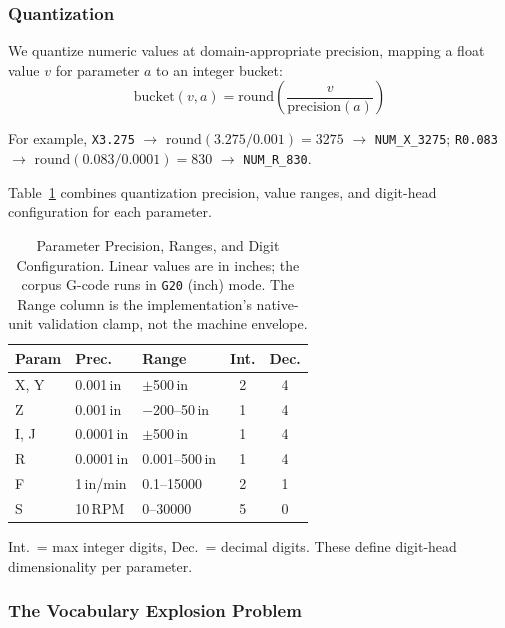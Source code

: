 \documentclass[sensors,article,submit,moreauthors,pdftex]{Definitions/mdpi}
\begin{document}
\subsubsection{Quantization}

We quantize numeric values at domain-appropriate precision, mapping a float value $v$ for parameter $a$ to an integer bucket:
\begin{equation}
    \text{bucket}(v, a) = \text{round}\!\left(\frac{v}{\text{precision}(a)}\right)
\end{equation}

\noindent For example, \texttt{X3.275} $\to$ $\text{round}(3.275/0.001) = 3275$ $\to$ \texttt{NUM\_X\_3275}; \texttt{R0.083} $\to$ $\text{round}(0.083/0.0001) = 830$ $\to$ \texttt{NUM\_R\_830}.

Table~\ref{tab:precision} combines quantization precision, value ranges, and digit-head configuration for each parameter.

\begin{table}[htbp]
\centering
\caption{Parameter Precision, Ranges, and Digit Configuration. Linear values are in inches; the corpus G-code runs in \texttt{G20} (inch) mode. The Range column is the implementation's native-unit validation clamp, not the machine envelope.}
\label{tab:precision}
\small
\begin{tabular}{@{}lllcc@{}}
\toprule
\textbf{Param} & \textbf{Prec.} & \textbf{Range} & \textbf{Int.} & \textbf{Dec.} \\
\midrule
X, Y  & 0.001\,in  & $\pm$500\,in     & 2 & 4 \\
Z     & 0.001\,in  & $-$200--50\,in   & 1 & 4 \\
I, J  & 0.0001\,in & $\pm$500\,in     & 1 & 4 \\
R     & 0.0001\,in & 0.001--500\,in   & 1 & 4 \\
F     & 1\,in/min  & 0.1--15000       & 2 & 1 \\
S     & 10\,RPM    & 0--30000         & 5 & 0 \\
\bottomrule
\end{tabular}
\normalsize

\smallskip
{\small Int.\ = max integer digits, Dec.\ = decimal digits. These define digit-head dimensionality per parameter.}
\end{table}

\subsubsection{The Vocabulary Explosion Problem}
\end{document}
